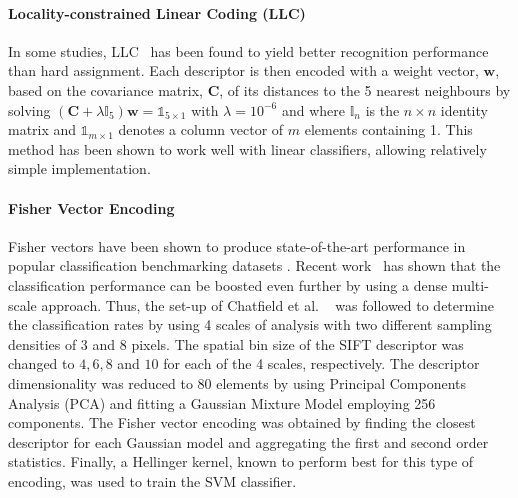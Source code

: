 \paragraph{Locality-constrained Linear Coding (LLC)} 
In some studies, LLC~\cite{Wang2010} has been found to yield better recognition performance than hard assignment. Each descriptor is then encoded with a weight vector, $\mathbf{w}$, based on the covariance matrix, $\mathbf{C}$, of its distances to the 5 nearest neighbours by solving $(\mathbf{C} + \lambda \mathbb{I}_{5})\mathbf{w} = \mathds{1}_{5\times 1}$ with $\lambda=10^{-6}$ and where $\mathbb{I}_n$ is the $n\times n$ identity matrix and $\mathds{1}_{m\times 1}$ denotes a column vector of $m$ elements containing 1. This method has been shown to work well with linear classifiers, allowing relatively simple implementation.
\paragraph{Fisher Vector Encoding} 
Fisher vectors have been shown to produce state-of-the-art performance in popular classification benchmarking datasets \cite{Chatfield2011}. Recent work~\cite{Perronnin2010} has shown that the classification performance can be boosted even further by using a dense multi-scale approach. Thus, the set-up of Chatfield et al. ~\cite{Chatfield2011} was followed to determine the classification rates by using 4 scales of analysis with two different sampling densities of 3 and 8 pixels. The spatial bin size of the SIFT descriptor was changed to $4,6,8$ and $10$ for each of the 4 scales, respectively. The descriptor dimensionality was reduced to 80 elements by using Principal Components Analysis (PCA) and fitting a Gaussian Mixture Model employing 256 components. The Fisher vector encoding was obtained by finding the closest descriptor for each Gaussian model and aggregating the first and second order statistics. Finally, a Hellinger kernel, known to perform best for this type of encoding, was used to train the SVM classifier.

